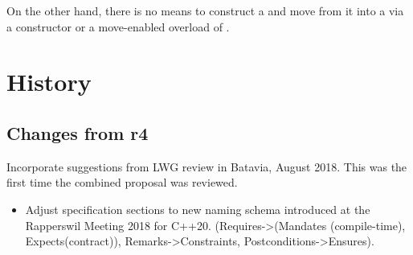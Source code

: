 \documentclass[ebook,11pt,article]{memoir}
\begin{document}
On the other hand, there is no means to construct a  and move from it into a  via a constructor or a move-enabled overload of .

\section{History}

\subsection{Changes from r4}
Incorporate suggestions from LWG review in Batavia, August 2018. This was the first time the combined proposal was reviewed.
\begin{itemize}
\item Adjust specification sections to new naming schema introduced at the Rapperswil Meeting 2018 for C++20. (Requires->(Mandates (compile-time), Expects(contract)), Remarks->Constraints, Postconditions->Ensures). 


\end{itemize}
\end{document}
